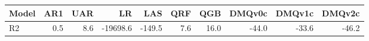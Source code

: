 \begin{tabular}{lrrrrrrrrr}
\toprule
Model & AR1 & UAR & LR & LAS & QRF & QGB & DMQv0c & DMQv1c & DMQv2c \\
\midrule
R2 & 0.5 & 8.6 & -19698.6 & -149.5 & 7.6 & 16.0 & -44.0 & -33.6 & -46.2 \\
\bottomrule
\end{tabular}
